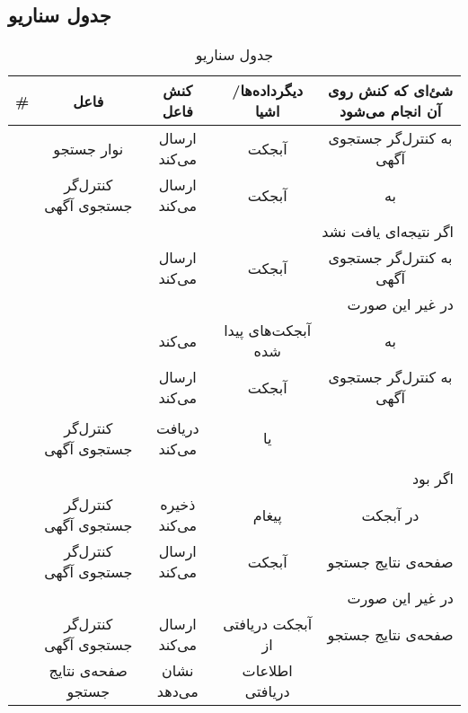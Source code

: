 \subsection{جدول سناریو}
\begin{table}[H]
	\caption{جدول سناریو }
	\begin{adjustbox}{width=\textwidth}
		\begin{tabular}{|c|c|c|c|c|}
			\hline								
			\# & فاعل & کنش فاعل & دیگرداده‌ها/اشیا & شئ‌ای که کنش روی آن انجام می‌شود \\
			\hline
			\hline
			\sstep &
			نوار جستجو &
			ارسال می‌کند &
			آبجکت \json &
			به کنترل‌گر جستجوی آگهی \\
			\hline
			\sstep &
			کنترل‌گر جستجوی آگهی&
			ارسال می‌کند &
			آبجکت \json &
			به \gdm\\
			\hline
			\sstep &
			\multicolumn{4}{|r|}{اگر نتیجه‌ای یافت نشد}\\
			\hline
			\sstep &
			\gdm&
			ارسال می‌کند &
			آبجکت \none&
			به کنترل‌گر جستجوی آگهی \\
			\hline
			\sstep &
			\multicolumn{4}{|r|}{در غیر این صورت}\\
			\hline
			\sstep &
			\gdm&
			\serialize می‌کند&
			آبجکت‌های پیدا شده &
			به \json \\
			\hline
			\sstep &
			\gdm &
			ارسال ‌می‌کند&
			آبجکت \json &
			به کنترل‌‌گر جستجوی آگهی \\
			\hline
			\sstep &
			کنترل‌‌گر جستجوی آگهی&
			دریافت می‌کند &
			\begin{inparaitem}
				\item \none 
			\end{inparaitem}
			یا 
			\begin{inparaitem}
				\item \json
			\end{inparaitem}
			&
			\\
			\hline
			\sstep &
			\multicolumn{4}{|r|}{اگر \none بود}
			\\
			\hline
			\sstep &
			کنترل‌گر جستجوی آگهی &
			ذخیره می‌کند &
			پیغام \say{آگهی‌ای پیدا نشد}&
			در آبجکت \json \\
			\hline
			\sstep &
			کنترل‌گر جستجوی آگهی &
			ارسال می‌کند &
			آبجکت \json &
			صفحه‌ی نتایج جستجو\\
			\hline
			\sstep &
			\multicolumn{4}{|r|}{در غیر این صورت}
			\\
			\hline
			\sstep &
			کنترل‌گر جستجوی آگهی&
			ارسال می‌کند &
			آبجکت \json دریافتی از \gdm&
			صفحه‌ی نتایج جستجو\\
			\hline
			\sstep & 
			صفحه‌ی نتایج جستجو &
			نشان می‌دهد & 
			 اطلاعات دریافتی & 
			 \\
			 \hline
		\end{tabular}
	\end{adjustbox}
\end{table}
\setcounter{MainStepCounter}{0}
\setcounter{SenarioCounter}{0}
